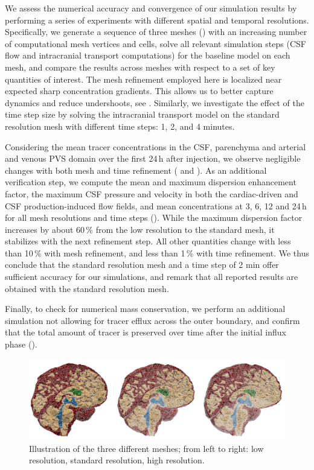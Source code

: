 \documentclass[fleqn,10pt]{wlscirep}
\begin{document}
We assess the numerical accuracy and convergence of our simulation results by performing a series of experiments with different spatial and temporal resolutions. Specifically, we generate a sequence of three meshes () with an increasing number of computational mesh vertices and cells, solve all relevant simulation steps (CSF flow and intracranial transport computations) for the baseline model on each mesh, and compare the results across meshes with respect to a set of key quantities of interest. The mesh refinement employed here is localized near expected sharp concentration gradients. This allows us to better capture dynamics and reduce undershoots, see .  
Similarly, we investigate the effect of the time step size by solving the intracranial transport model on the standard resolution mesh with different time steps: 1, 2, and 4 minutes. 

Considering the mean tracer concentrations in the CSF, parenchyma and
arterial and venous PVS domain over the first 24\,h after injection,
we observe negligible changes with both mesh and time refinement
( and
). As an additional
verification step, we compute the mean and maximum dispersion
enhancement factor, the maximum CSF pressure and velocity in both the
cardiac-driven and CSF production-induced flow fields, and mean
concentrations at 3, 6, 12 and 24\,h for all mesh resolutions and time
steps (). While the maximum dispersion factor
increases by about 60\,\% from the low resolution to the standard mesh, it
stabilizes with the next refinement step. All other quantities change
with less than 10\,\% with mesh refinement, and less than 1\,\% with
time refinement. We thus conclude that the standard resolution mesh and a time step of 2 min offer sufficient accuracy for our simulations, and remark that all reported results are obtained with the standard resolution mesh. 

Finally, to check for numerical mass conservation, we perform an
additional simulation not allowing for tracer efflux across the outer
boundary, and confirm that the total amount of tracer is preserved
over time after the initial influx phase
().
\begin{figure}
    \centering
\includegraphics[width=0.9\linewidth]{figures/mesh_refinement.png}
    \caption{Illustration of the three different meshes; from left to right: low resolution, standard resolution, high resolution.}
    \label{fig:mesh_refinement}
\end{figure}
\end{document}
